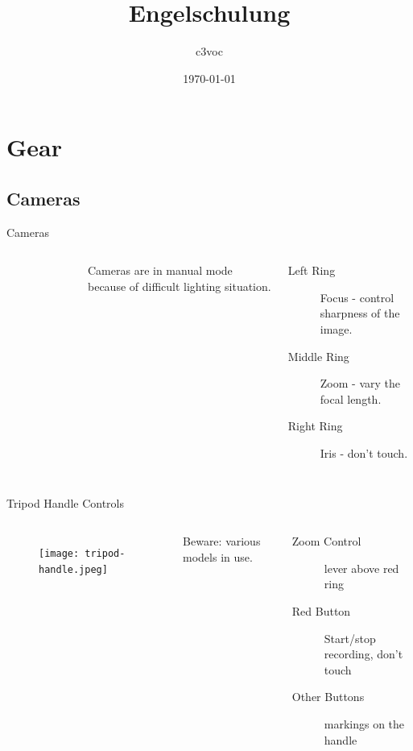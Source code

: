 \documentclass[hyperref={pdfpagelabels=false},aspectratio=169]{beamer}
\title{Engelschulung}    %
\author{c3voc}   %
\date{\today}
\begin{document}
\begin{frame}
\titlepage
\end{frame} 


\begin{frame}  
\tableofcontents
\end{frame} 

\section{Gear}  %
\subsection{Cameras}
\begin{frame}{Cameras}
	\begin{columns}[T,onlytextwidth]
	\begin{figure} 
		\centering
		\def\svgwidth{1\textwidth}
		
	\end{figure}
	Cameras are in manual mode because of difficult lighting situation.
	\begin{description}
		\item[Left Ring] Focus - control sharpness of the image.
		\item[Middle Ring] Zoom - vary the focal length.
		\item[Right Ring] Iris - don't touch.
     \end{description}
\end{columns}
\end{frame}

\begin{frame}{Tripod Handle Controls}
	\begin{columns}[T,onlytextwidth]
	\begin{figure} 
		\centering
		\texttt{[image: tripod-handle.jpeg]}
	\end{figure}
	Beware: various models in use.
	\begin{description}
		\item[Zoom Control] lever above red ring
		\item[Red Button] Start/stop recording, don't touch
		\item[Other Buttons] markings on the handle
    \end{description}
	\end{columns}
\end{frame}
\end{document}
